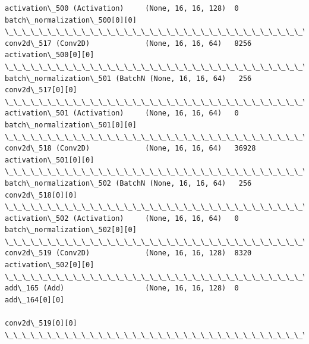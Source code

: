 \documentclass[11pt]{article}
\begin{document}
\begin{Verbatim}[commandchars=\\\{\}]
activation\_500 (Activation)     (None, 16, 16, 128)  0           batch\_normalization\_500[0][0]    
\_\_\_\_\_\_\_\_\_\_\_\_\_\_\_\_\_\_\_\_\_\_\_\_\_\_\_\_\_\_\_\_\_\_\_\_\_\_\_\_\_\_\_\_\_\_\_\_\_\_\_\_\_\_\_\_\_\_\_\_\_\_\_\_\_\_\_\_\_\_\_\_\_\_\_\_\_\_\_\_\_\_\_\_\_\_\_\_\_\_\_\_\_\_\_\_\_\_
conv2d\_517 (Conv2D)             (None, 16, 16, 64)   8256        activation\_500[0][0]             
\_\_\_\_\_\_\_\_\_\_\_\_\_\_\_\_\_\_\_\_\_\_\_\_\_\_\_\_\_\_\_\_\_\_\_\_\_\_\_\_\_\_\_\_\_\_\_\_\_\_\_\_\_\_\_\_\_\_\_\_\_\_\_\_\_\_\_\_\_\_\_\_\_\_\_\_\_\_\_\_\_\_\_\_\_\_\_\_\_\_\_\_\_\_\_\_\_\_
batch\_normalization\_501 (BatchN (None, 16, 16, 64)   256         conv2d\_517[0][0]                 
\_\_\_\_\_\_\_\_\_\_\_\_\_\_\_\_\_\_\_\_\_\_\_\_\_\_\_\_\_\_\_\_\_\_\_\_\_\_\_\_\_\_\_\_\_\_\_\_\_\_\_\_\_\_\_\_\_\_\_\_\_\_\_\_\_\_\_\_\_\_\_\_\_\_\_\_\_\_\_\_\_\_\_\_\_\_\_\_\_\_\_\_\_\_\_\_\_\_
activation\_501 (Activation)     (None, 16, 16, 64)   0           batch\_normalization\_501[0][0]    
\_\_\_\_\_\_\_\_\_\_\_\_\_\_\_\_\_\_\_\_\_\_\_\_\_\_\_\_\_\_\_\_\_\_\_\_\_\_\_\_\_\_\_\_\_\_\_\_\_\_\_\_\_\_\_\_\_\_\_\_\_\_\_\_\_\_\_\_\_\_\_\_\_\_\_\_\_\_\_\_\_\_\_\_\_\_\_\_\_\_\_\_\_\_\_\_\_\_
conv2d\_518 (Conv2D)             (None, 16, 16, 64)   36928       activation\_501[0][0]             
\_\_\_\_\_\_\_\_\_\_\_\_\_\_\_\_\_\_\_\_\_\_\_\_\_\_\_\_\_\_\_\_\_\_\_\_\_\_\_\_\_\_\_\_\_\_\_\_\_\_\_\_\_\_\_\_\_\_\_\_\_\_\_\_\_\_\_\_\_\_\_\_\_\_\_\_\_\_\_\_\_\_\_\_\_\_\_\_\_\_\_\_\_\_\_\_\_\_
batch\_normalization\_502 (BatchN (None, 16, 16, 64)   256         conv2d\_518[0][0]                 
\_\_\_\_\_\_\_\_\_\_\_\_\_\_\_\_\_\_\_\_\_\_\_\_\_\_\_\_\_\_\_\_\_\_\_\_\_\_\_\_\_\_\_\_\_\_\_\_\_\_\_\_\_\_\_\_\_\_\_\_\_\_\_\_\_\_\_\_\_\_\_\_\_\_\_\_\_\_\_\_\_\_\_\_\_\_\_\_\_\_\_\_\_\_\_\_\_\_
activation\_502 (Activation)     (None, 16, 16, 64)   0           batch\_normalization\_502[0][0]    
\_\_\_\_\_\_\_\_\_\_\_\_\_\_\_\_\_\_\_\_\_\_\_\_\_\_\_\_\_\_\_\_\_\_\_\_\_\_\_\_\_\_\_\_\_\_\_\_\_\_\_\_\_\_\_\_\_\_\_\_\_\_\_\_\_\_\_\_\_\_\_\_\_\_\_\_\_\_\_\_\_\_\_\_\_\_\_\_\_\_\_\_\_\_\_\_\_\_
conv2d\_519 (Conv2D)             (None, 16, 16, 128)  8320        activation\_502[0][0]             
\_\_\_\_\_\_\_\_\_\_\_\_\_\_\_\_\_\_\_\_\_\_\_\_\_\_\_\_\_\_\_\_\_\_\_\_\_\_\_\_\_\_\_\_\_\_\_\_\_\_\_\_\_\_\_\_\_\_\_\_\_\_\_\_\_\_\_\_\_\_\_\_\_\_\_\_\_\_\_\_\_\_\_\_\_\_\_\_\_\_\_\_\_\_\_\_\_\_
add\_165 (Add)                   (None, 16, 16, 128)  0           add\_164[0][0]                    
                                                                 conv2d\_519[0][0]                 
\_\_\_\_\_\_\_\_\_\_\_\_\_\_\_\_\_\_\_\_\_\_\_\_\_\_\_\_\_\_\_\_\_\_\_\_\_\_\_\_\_\_\_\_\_\_\_\_\_\_\_\_\_\_\_\_\_\_\_\_\_\_\_\_\_\_\_\_\_\_\_\_\_\_\_\_\_\_\_\_\_\_\_\_\_\_\_\_\_\_\_\_\_\_\_\_\_\_

\end{Verbatim}
\end{document}
